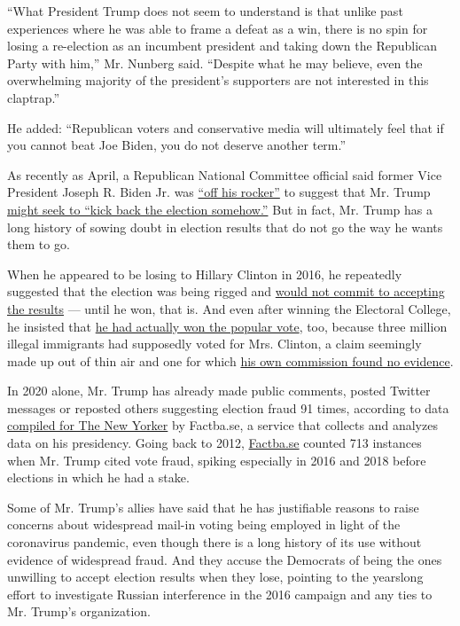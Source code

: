 ``What President Trump does not seem to understand is that unlike past
experiences where he was able to frame a defeat as a win, there is no
spin for losing a re-election as an incumbent president and taking down
the Republican Party with him,'' Mr. Nunberg said. ``Despite what he may
believe, even the overwhelming majority of the president's supporters
are not interested in this claptrap.''

He added: ``Republican voters and conservative media will ultimately
feel that if you cannot beat Joe Biden, you do not deserve another
term.''

As recently as April, a Republican National Committee official said
former Vice President Joseph R. Biden Jr. was
\href{https://twitter.com/SteveGuest/status/1253796935011651587}{``off
his rocker''} to suggest that Mr. Trump
\href{https://www.nytimes.com/2020/04/24/us/politics/joseph-biden-trump-election.html?smid=tw-share}{might
seek to ``kick back the election somehow.''} But in fact, Mr. Trump has
a long history of sowing doubt in election results that do not go the
way he wants them to go.

When he appeared to be losing to Hillary Clinton in 2016, he repeatedly
suggested that the election was being rigged and
\href{https://www.nytimes.com/2016/10/20/us/politics/presidential-debate.html}{would
not commit to accepting the results} --- until he won, that is. And even
after winning the Electoral College, he insisted that
\href{https://www.nytimes.com/2016/11/27/us/politics/trump-adviser-steps-up-searing-attack-on-romney.html}{he
had actually won the popular vote}, too, because three million illegal
immigrants had supposedly voted for Mrs. Clinton, a claim seemingly made
up out of thin air and one for which
\href{https://www.nytimes.com/2018/01/03/us/politics/trump-voter-fraud-commission.html}{his
own commission found no evidence}.

In 2020 alone, Mr. Trump has already made public comments, posted
Twitter messages or reposted others suggesting election fraud 91 times,
according to data
\href{https://www.newyorker.com/news/letter-from-trumps-washington/trump-is-the-election-crisis-he-is-warning-about}{compiled
for The New Yorker} by Factba.se, a service that collects and analyzes
data on his presidency. Going back to 2012,
\href{https://factba.se/}{Factba.se} counted 713 instances when Mr.
Trump cited vote fraud, spiking especially in 2016 and 2018 before
elections in which he had a stake.

Some of Mr. Trump's allies have said that he has justifiable reasons to
raise concerns about widespread mail-in voting being employed in light
of the coronavirus pandemic, even though there is a long history of its
use without evidence of widespread fraud. And they accuse the Democrats
of being the ones unwilling to accept election results when they lose,
pointing to the yearslong effort to investigate Russian interference in
the 2016 campaign and any ties to Mr. Trump's organization.

